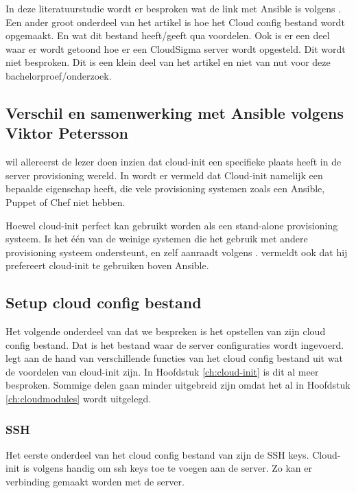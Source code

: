 In deze literatuurstudie wordt er besproken wat de link met Ansible is volgens \autocite{viktorpet}. Een ander groot onderdeel van het artikel is hoe het Cloud config bestand wordt opgemaakt. En wat dit bestand heeft/geeft qua voordelen. Ook is er een deel waar er wordt getoond hoe er een CloudSigma server wordt opgesteld. Dit wordt niet besproken. Dit is een klein deel van het artikel en niet van nut voor deze bachelorproef/onderzoek.

\newpage
\subsection{Verschil en samenwerking met Ansible volgens Viktor Petersson}
\autocite{viktorpet} wil allereerst de lezer doen inzien dat cloud-init een specifieke plaats heeft in de server provisioning wereld. In \autocite{viktorpet} wordt er vermeld dat Cloud-init namelijk een bepaalde eigenschap heeft, die vele provisioning systemen zoals een Ansible, Puppet of Chef niet hebben. 

Hoewel cloud-init perfect kan gebruikt worden als een stand-alone provisioning systeem. Is het één van de weinige systemen die het gebruik met andere provisioning systeem ondersteunt, en zelf aanraadt volgens \autocite{viktorpet}. \autocite{viktorpet} vermeldt ook dat hij prefereert cloud-init te gebruiken boven Ansible.

\subsection{Setup cloud config bestand}
Het volgende onderdeel van \autocite{viktorpet} dat we bespreken is het opstellen van zijn cloud config bestand. Dat is het bestand waar de server configuraties wordt ingevoerd. \autocite{viktorpet} legt aan de hand van verschillende functies van het cloud config bestand uit wat de voordelen van cloud-init zijn. In Hoofdstuk \ref*{ch:cloud-init} is dit al meer besproken. Sommige delen gaan minder uitgebreid zijn omdat het al in Hoofdstuk \ref*{ch:cloudmodules} wordt uitgelegd.

\subsubsection{SSH}
Het eerste onderdeel van het cloud config bestand van \autocite{viktorpet} zijn de SSH keys. Cloud-init is volgens \autocite{viktorpet} handig om ssh keys toe te voegen aan de server. Zo kan er verbinding gemaakt worden met de server. 


